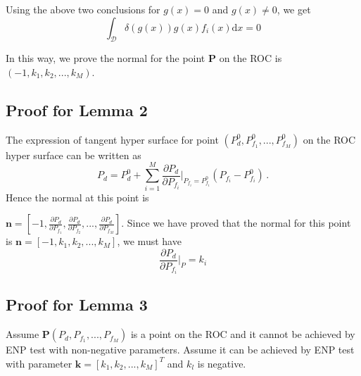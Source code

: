 \documentclass[12pt,journal,a4paper,twoside,onecolumn]{IEEEtran}
\begin{document}
\begin{spacing}{2.5}
Using the above two conclusions for $g(x) = 0$ and $g(x) \neq 0$, we get
\begin{equation}
\int_{\mathcal{D}} \delta (g(x)) g(x)f_i(x) \mathrm{d}x = 0
\end{equation}

In this way, we prove the normal for the point \textbf{P} on the ROC is $(-1, k_1, k_2, ..., k_M)$.

\subsection{Proof for Lemma 2}
The expression of tangent hyper surface for point $(P_d^0, P_{f_1}^0, ..., P_{f_M}^0)$ on the ROC hyper surface can be written as
\begin{equation}
P_d = P_d^0 + \sum_{i=1}^{M} \frac{\partial P_d}{\partial P_{f_i}}\bigg|_{P_{f_i} = P_{f_i}^0}(P_{f_i} - P_{f_i}^0)\,.
\end{equation}
Hence the normal at this point is

 $\mathbf{n} = [-1, \frac{\partial P_d}{\partial P_{f_1}}, \frac{\partial P_d}{\partial P_{f_2}}, ..., \frac{\partial P_d}{\partial P_{f_M}}]$. Since we have proved that  the normal for this point is $\mathbf{n} = [-1, k_1, k_2, ..., k_M]$, we must have
\begin{equation}
\frac{\partial P_d}{\partial P_{f_i}}\bigg|_{P} = k_i
\end{equation}


\subsection{Proof for Lemma 3}
Assume $\mathbf{P} (P_d, P_{f_1}, ..., P_{f_M})$ is a point on the ROC and it cannot be achieved by ENP test with non-negative parameters. Assume it can be achieved by ENP test with parameter $\mathbf{k} = [k_1, k_2, ..., k_M]^T$ and $k_l$ is negative.


\end{spacing}
\end{document}
